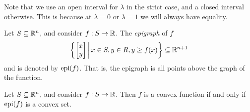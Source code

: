 \begin{rmk}
    Note that we use an open interval for $\lambda$ in the strict case, and a closed interval otherwise. This is because at $\lambda = 0$ or $\lambda = 1$ we will always have equality.
\end{rmk}

\begin{defn}
    Let $S \subseteq \mathbb{R}^n$, and consider $f: S \to \mathbb{R}$. The \emph{epigraph} of $f$ 
    \begin{align*}
        \left\{\begin{bmatrix}
            x \\ y
        \end{bmatrix} \,\middle|\, x \in S, y \in R, y \geq f(x)\right\} \subseteq \mathbb{R}^{n+1}
    \end{align*}
    and is denoted by $\operatorname{epi}(f)$. That is, the epigraph is all points above the graph of the function.
\end{defn}

\begin{prop}\label{epigraph-convexity}
    Let $S \subseteq \mathbb{R}^n$, and consider $f: S \to \mathbb{R}$. Then $f$ is a convex function if and only if $\operatorname{epi}(f)$ is a convex set.
\end{prop}

